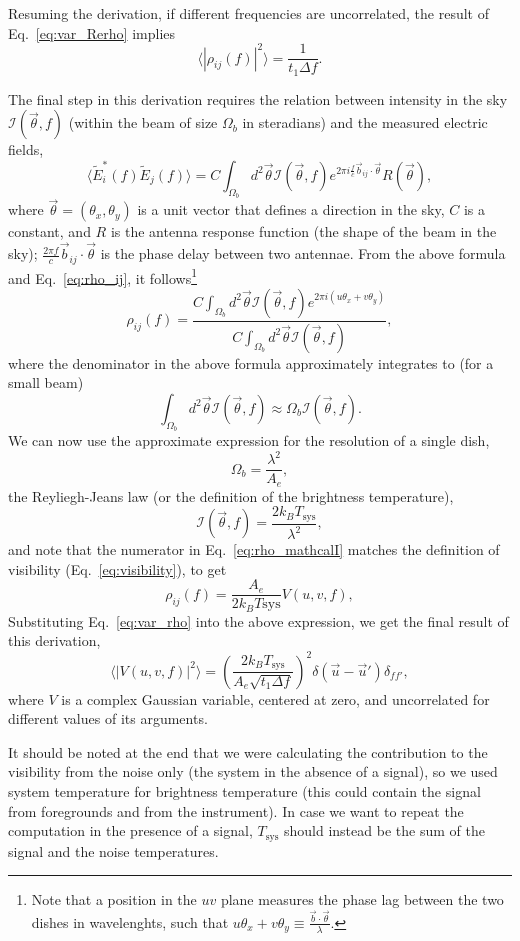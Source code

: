 \documentclass[12pt]{paper}
\newcommand{\beq}{\begin{equation}}
\newcommand{\eeq}{\end{equation}}
\begin{document}
Resuming the derivation, if different frequencies are uncorrelated, the result of Eq.~\ref{eq:var_Rerho} implies
\beq
\langle|\rho_{ij}(f)|^2\rangle = \frac{1}{t_1\Delta f}.
\label{eq:var_rho}
\eeq

The final step in this derivation requires the relation between intensity in the sky $\mathcal{I}(\vec\theta, f)$ (within the beam of size $\Omega_b$ in steradians) and the measured electric fields,
\beq
\langle \widetilde{E}_i^*(f)\widetilde{E}_j(f)\rangle = C \int_{\Omega_b} d^2\vec\theta\mathcal{I}(\vec\theta, f)e^{2\pi i\frac{ f}{c}\vec{b}_{ij}\cdot\vec{\theta}  }R(\vec\theta),
\label{eq:E_vs_mathcalI}
\eeq
where $\vec\theta=(\theta_x,\theta_y)$ is a unit vector that defines a direction in the sky, $C$ is a constant, and $R$ is the antenna response function (the shape of the beam in the sky); $\frac{2\pi f}{c}\vec{b}_{ij}\cdot\vec{\theta}$ is the phase delay between two antennae. From the above formula and Eq.~\ref{eq:rho_ij}, it follows\footnote{Note that a position in the $uv$ plane measures the phase lag between the two dishes in wavelenghts, such that $u\theta_x + v\theta_y\equiv\frac{\vec b\cdot \vec\theta}{\lambda}$.}
\beq
\rho_{ij}(f) = \frac{C\int_{\Omega_b}d^2\vec\theta\mathcal{I}(\vec\theta, f)e^{2\pi i(u\theta_x+v\theta_y)}}{C\int_{\Omega_b}d^2\vec\theta\mathcal{I}(\vec\theta, f)},
\label{eq:rho_mathcalI}
\eeq
where the denominator in the above formula approximately integrates to (for a small beam)
\beq
\int_{\Omega_b}d^2\vec\theta\mathcal{I}(\vec\theta, f) \approx
\Omega_b \mathcal{I}(\vec\theta, f).
\label{eq:rho_denominator}
\eeq
We can now use the approximate expression for the resolution of a single dish,
\beq
\Omega_b = \frac{\lambda^2}{A_e},
\label{eq:Omegab}
\eeq
the Reyliegh-Jeans law (or the definition of the brightness temperature),
\beq
\mathcal{I}(\vec\theta, f) = \frac{2k_BT_\text{sys}}{\lambda^2},
\label{eq:I_Tsys}
\eeq
and note that the numerator in Eq.~\ref{eq:rho_mathcalI} matches the definition of visibility (Eq.~\ref{eq:visibility}), to get 
\beq
\rho_{ij}(f) = \frac{A_e}{2k_BT\text{sys}}V(u,v,f),
\label{eq:rho_V}
\eeq
Substituting Eq.~\ref{eq:var_rho} into the above expression, we get the final result of this derivation,
\beq
\langle|V(u,v,f)|^2\rangle = \left(\frac{2k_BT_\text{sys}}{A_e\sqrt{t_1\Delta f}}\right)^2\delta(\vec{u}-\vec{u}')\delta_{ff'},
\label{eq:Vrms_final}
\eeq
where $V$ is a complex Gaussian variable, centered at zero, and uncorrelated for different values of its arguments.

It should be noted at the end that we were calculating the contribution to the visibility from the noise only (the system in the absence of a signal), so we used system temperature for brightness temperature (this could contain the signal from foregrounds and from the instrument). In case we want to repeat the computation in the presence of a signal, $T_\text{sys}$ should instead be the sum of the signal and the noise temperatures.
\end{document}
